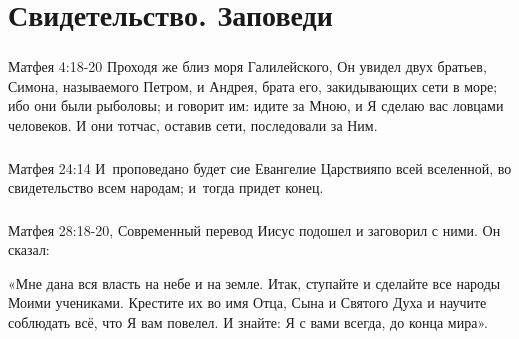 \documentclass[t,aspectratio=169,14pt]{beamer}  %
\begin{document}
\section{Свидетельство. Заповеди}
\begin{frame}
	\frametitle{\insertsection}

	\begin{block}{Матфея 4:18-20}
		Проходя же близ моря Галилейского, Он увидел двух братьев, Симона, называемого Петром, и Андрея, брата его, закидывающих сети в море; 
		ибо они были рыболовы; и говорит им: \vspace{0.3cm}
		\linebreak идите за Мною, и Я сделаю вас ловцами человеков. \vspace{0.3cm}
		\linebreak И они тотчас, оставив сети, последовали за Ним.
	\end{block}
\end{frame} 
\begin{frame}
	\frametitle{\insertsection}

	\begin{block}{Матфея 24:14}
		И проповедано будет сие Евангелие Царствия\linebreak по всей вселенной,\linebreak 
		во свидетельство всем народам;\linebreak
		и тогда придет конец.
	\end{block}

\end{frame}
\begin{frame}
	\frametitle{\insertsection}

	\begin{block}{Матфея 28:18-20, Современный перевод}
		Иисус подошел и заговорил с ними. Он сказал:\vspace{0.3cm}
		
		«Мне дана вся власть на небе и на земле.\linebreak 
		Итак, \linebreak  \hphantom{aaa}ступайте \linebreak и \hphantom{a}сделайте все народы Моими учениками. \linebreak 
		\hphantom{aaa}Крестите их во имя Отца, Сына и Святого Духа \linebreak 
		и \hphantom{a}научите соблюдать всё, что Я вам повелел. \linebreak 
		И \hphantom{a}знайте: Я с вами всегда, до конца мира».
	\end{block}
\end{frame}
\end{document}

